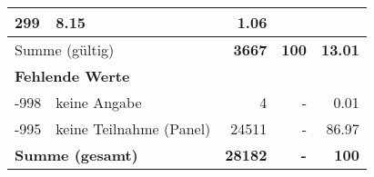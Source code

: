 \begin{longtable}{lXrrr}
       \num{299} &
       \num[round-mode=places,round-precision=2]{8.15} &
         \num[round-mode=places,round-precision=2]{1.06} \\
     \midrule
     \multicolumn{2}{l}{Summe (gültig)} &
       \textbf{\num{3667}} &
     \textbf{100} &
       \textbf{\num[round-mode=places,round-precision=2]{13.01}} \\
     \multicolumn{5}{l}{\textbf{Fehlende Werte}}\\
       -998 &
       keine Angabe &
         \num{4} &
        - &
         \num[round-mode=places,round-precision=2]{0.01} \\
       -995 &
       keine Teilnahme (Panel) &
         \num{24511} &
        - &
         \num[round-mode=places,round-precision=2]{86.97} \\
     \midrule
     \multicolumn{2}{l}{\textbf{Summe (gesamt)}} &
          \textbf{\num{28182}} &
        \textbf{-} &
        \textbf{100} \\
     \bottomrule
     \end{longtable}
     
